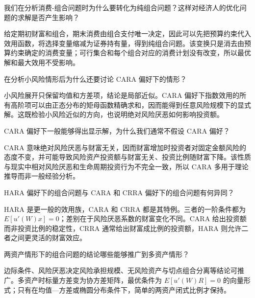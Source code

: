 
\begin{problem}
 我们在分析消费-组合问题时为什么要转化为纯组合问题？这样对经济人的优化问题的求解是否产生影响？
\end{problem}
\begin{solution}
给定期初财富和组合，期末消费由组合支付唯一决定，因此可以先把预算约束代入效用函数，将选择变量缩减为证券持有量，得到纯组合问题。该变换只是消去由预算约束确定的消费变量；可行集合和每个组合对应的消费计划没有改变，所以最优解和最大效用不受影响。
\end{solution}
\begin{problem}
 在分析小风险情形后为什么还要讨论 CARA 偏好下的情形？
\end{problem}
\begin{solution}
小风险展开只保留均值和方差项，结论是局部近似。CARA 偏好下指数效用的所有高阶项可以由正态分布的矩母函数精确求和，因而能得到任意风险规模下的显式解。这既检验小风险近似的方向，也说明绝对风险厌恶如何影响投资额。
\end{solution}
\begin{problem}
 CARA 偏好下一般能够得出显示解，为什么我们通常不假设 CARA 偏好？
\end{problem}
\begin{solution}
CARA 意味绝对风险厌恶与财富无关，因而财富增加时投资者对固定金额风险的态度不变，并可能导致风险资产投资额与财富无关、投资比例随财富下降。该性质与现实中相对风险厌恶和生命周期投资行为不完全一致，所以 CARA 多用于理论推导而非一般经验分析。
\end{solution}
\begin{problem}
 HARA 偏好下的组合问题与 CARA 和 CRRA 偏好下的组合问题有何异同？
\end{problem}
\begin{solution}
HARA 是更一般的效用族，CARA 和 CRRA 都是其特例。三者的一阶条件都为 $E[u'(W)x]=0$；差别在于风险厌恶系数的财富变化不同。CARA 给出投资额而非投资比例的稳定性，CRRA 通常给出财富成比例的投资额，HARA 则允许二者之间更灵活的财富效应。
\end{solution}
\begin{problem}
 两资产情形下的组合问题的结论哪些能够推广到多资产情形？
\end{problem}
\begin{solution}
边际条件、风险厌恶决定风险承担规模、无风险资产与切点组合分离等结论可推广。多资产时标量方差变为协方差矩阵，最优条件为 $E[u'(W)R]=0$ 的向量形式；只有在均值—方差或椭圆分布条件下，简单的两资产闭式比例才保持。
\end{solution}

